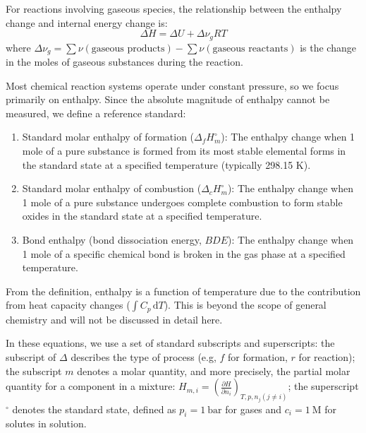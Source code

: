 \begin{proposition}
For reactions involving gaseous species, the relationship between the enthalpy change and internal energy change is:
$$\Delta H = \Delta U + \Delta \nu_g RT$$
where $\Delta \nu_g = \sum \nu(\text{gaseous products}) - \sum \nu(\text{gaseous reactants})$ is the change in the moles of gaseous substances during the reaction.
\end{proposition}

Most chemical reaction systems operate under constant pressure, so we focus primarily on enthalpy. Since the absolute magnitude of enthalpy cannot be measured, we define a reference standard:

\begin{definition}
\begin{enumerate}
    \item Standard molar enthalpy of formation ($\Delta_f H_m^\circ$): The enthalpy change when 1 mole of a pure substance is formed from its most stable elemental forms in the standard state at a specified temperature (typically 298.15 K).
    \item Standard molar enthalpy of combustion ($\Delta_c H_m^\circ$): The enthalpy change when 1 mole of a pure substance undergoes complete combustion to form stable oxides in the standard state at a specified temperature.
    \item Bond enthalpy (bond dissociation energy, $BDE$): The enthalpy change when 1 mole of a specific chemical bond is broken in the gas phase at a specified temperature.
\end{enumerate}
\end{definition}

From the definition, enthalpy is a function of temperature due to the contribution from heat capacity changes ($\int C_p \,\mathrm{d}T$). This is beyond the scope of general chemistry and will not be discussed in detail here.

In these equations, we use a set of standard subscripts and superscripts: the subscript of $\Delta$ describes the type of process (e.g, $f$ for formation, $r$ for reaction); the subscript $m$ denotes a molar quantity, and more precisely, the partial molar quantity for a component in a mixture: $H_{m,i} = \left( \frac{\partial H}{\partial n_i} \right)_{T, p, n_j (j \neq i)}$; the superscript $^\circ$ denotes the standard state, defined as $p_i = 1\ \mathrm{bar}$ for gases and $c_i = 1\ \mathrm{M}$ for solutes in solution.

